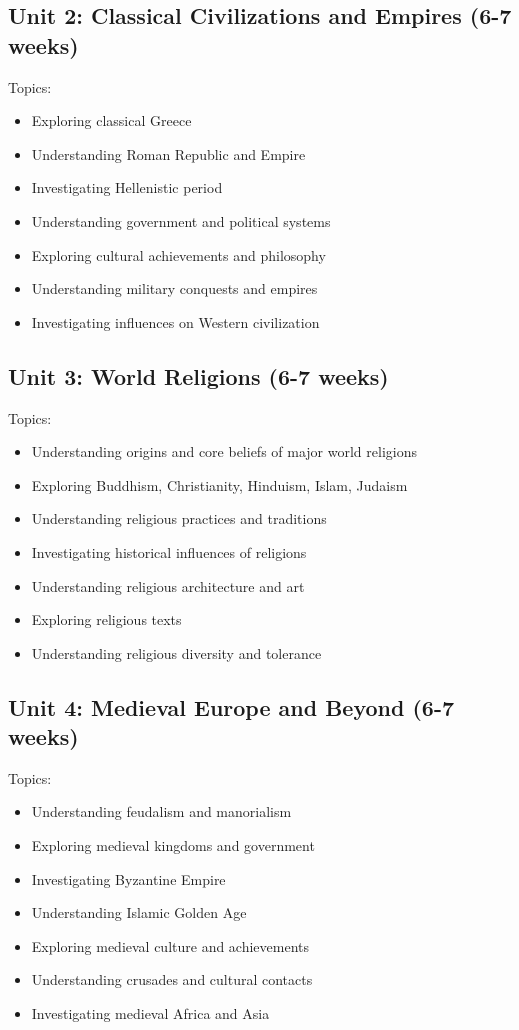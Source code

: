 \documentclass[11pt,letterpaper]{report}
\begin{document}
\subsection{Unit 2: Classical Civilizations and Empires (6-7 weeks)}

Topics:
\begin{itemize}
\item Exploring classical Greece
\item Understanding Roman Republic and Empire
\item Investigating Hellenistic period
\item Understanding government and political systems
\item Exploring cultural achievements and philosophy
\item Understanding military conquests and empires
\item Investigating influences on Western civilization
\end{itemize}

\subsection{Unit 3: World Religions (6-7 weeks)}

Topics:
\begin{itemize}
\item Understanding origins and core beliefs of major world religions
\item Exploring Buddhism, Christianity, Hinduism, Islam, Judaism
\item Understanding religious practices and traditions
\item Investigating historical influences of religions
\item Understanding religious architecture and art
\item Exploring religious texts
\item Understanding religious diversity and tolerance
\end{itemize}

\subsection{Unit 4: Medieval Europe and Beyond (6-7 weeks)}

Topics:
\begin{itemize}
\item Understanding feudalism and manorialism
\item Exploring medieval kingdoms and government
\item Investigating Byzantine Empire
\item Understanding Islamic Golden Age
\item Exploring medieval culture and achievements
\item Understanding crusades and cultural contacts
\item Investigating medieval Africa and Asia
\end{itemize}
\end{document}
